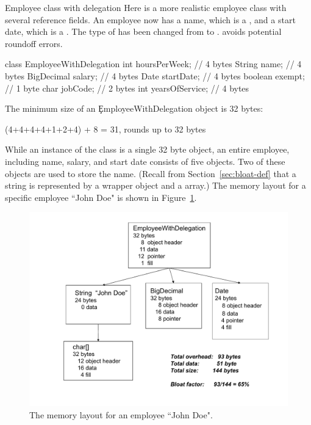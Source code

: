 \begin{example}{Employee class with delegation}
Here is a more realistic employee class with several reference fields. An
employee now has a name, which is a , and a start date, which is a
. The type of  has been changed from 
to .  avoids potential roundoff errors.
\begin{shortlisting} 
class EmployeeWithDelegation {
    int hoursPerWeek;           // 4 bytes
    String name;                // 4 bytes
    BigDecimal salary;          // 4 bytes
    Date startDate;             // 4 bytes
    boolean exempt;             // 1 byte
    char jobCode;               // 2 bytes
    int yearsOfService;         // 4 bytes
}
\end{shortlisting}

The minimum size of an \c{EmployeeWithDelegation} object is 32 bytes:
\begin{shortlisting}
(4+4+4+4+1+2+4) + 8 = 31, rounds up to 32 bytes
\end{shortlisting}
\end{example}

While an instance of the  class is a single 32
byte object, an entire employee, including name, salary, and start date
consists of five objects. Two of these objects are used to store the name.
(Recall from Section~\ref{sec:bloat-def} that a string is represented by a
wrapper  object and a  array.) The memory layout for
a specific employee ``John Doe" is shown in Figure~\ref{fig:employee-status}.
 \begin{figure}
  \centering
 \includegraphics[width=.80\textwidth]{Figures/chapter4/employee-status.pdf}
  \caption{The memory layout for an employee ``John Doe".}
  \label{fig:employee-status}
\end{figure}

